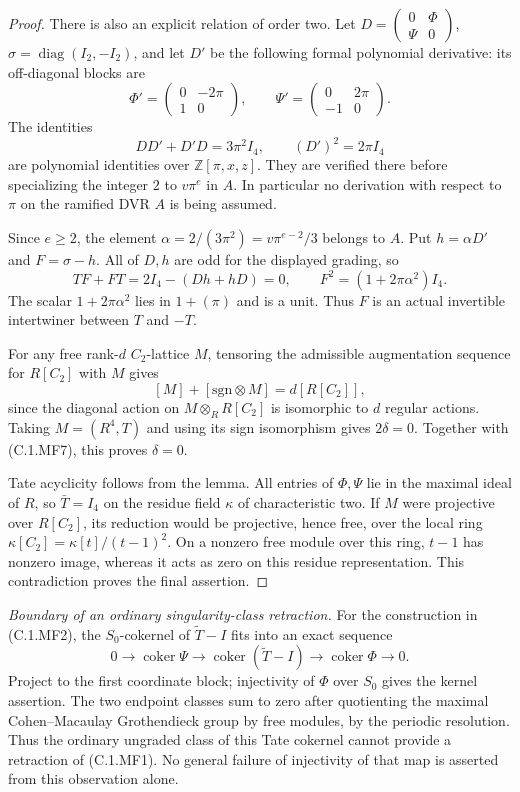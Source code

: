 \begin{proof}
There is also an explicit relation of order two.
Let $D=\left(\begin{smallmatrix}0&\Phi\\\Psi&0\end{smallmatrix}\right)$,
$\sigma=\operatorname{diag}(I_2,-I_2)$, and let $D'$
be the following formal polynomial derivative:
its off-diagonal blocks are
\[
 \Phi'=\begin{pmatrix}0&-2\pi\\1&0\end{pmatrix},
 \qquad
 \Psi'=\begin{pmatrix}0&2\pi\\-1&0\end{pmatrix}.
\]
The identities
\[
                  DD'+D'D=3\pi^2I_4,
                  \qquad (D')^2=2\pi I_4             \tag{C.1.MF8}
\]
are polynomial identities over $\mathbb Z[\pi,x,z]$.
They are verified there before specializing the integer
$2$ to $v\pi^e$ in $A$.
In particular no derivation with respect to $\pi$ on
the ramified DVR $A$ is being assumed.

Since $e\geq2$, the element
$\alpha=2/(3\pi^2)=v\pi^{e-2}/3$ belongs to $A$.
Put $h=\alpha D'$ and $F=\sigma-h$.
All of $D,h$ are odd for the displayed grading, so
\[
 TF+FT=2I_4-(Dh+hD)=0,
 \qquad
 F^2=(1+2\pi\alpha^2)I_4.                         \tag{C.1.MF9}
\]
The scalar $1+2\pi\alpha^2$ lies in $1+(\pi)$ and
is a unit.  Thus $F$ is an actual invertible
intertwiner between $T$ and $-T$.

For any free rank-$d$ $C_2$-lattice $M$, tensoring
the admissible augmentation sequence for $R[C_2]$
with $M$ gives
\[
 [M]+[\mathrm{sgn}\otimes M]=d[R[C_2]],
\]
since the diagonal action on $M\otimes_RR[C_2]$
is isomorphic to $d$ regular actions.
Taking $M=(R^4,T)$ and using its sign isomorphism
gives $2\delta=0$.
Together with (C.1.MF7), this proves $\delta=0$.

Tate acyclicity follows from the lemma.
All entries of $\Phi,\Psi$ lie in the maximal
ideal of $R$, so $\bar T=I_4$ on the residue field
$\kappa$ of characteristic two.
If $M$ were projective over $R[C_2]$, its reduction
would be projective, hence free, over the local ring
$\kappa[C_2]=\kappa[t]/(t-1)^2$.
On a nonzero free module over this ring, $t-1$ has
nonzero image, whereas it acts as zero on this
residue representation.  This contradiction proves
the final assertion.
\end{proof}

\noindent\emph{Boundary of an ordinary singularity-class retraction.}
For the construction in (C.1.MF2), the $S_0$-cokernel
of $\widetilde T-I$ fits into an exact sequence
\[
 0\longrightarrow\operatorname{coker}\Psi
  \longrightarrow\operatorname{coker}(\widetilde T-I)
  \longrightarrow\operatorname{coker}\Phi
  \longrightarrow0.
\]
Project to the first coordinate block; injectivity
of $\Phi$ over $S_0$ gives the kernel assertion.
The two endpoint classes sum to zero after quotienting
the maximal Cohen--Macaulay Grothendieck group by free
modules, by the periodic resolution.
Thus the ordinary ungraded class of this Tate cokernel
cannot provide a retraction of (C.1.MF1).
No general failure of injectivity of that map is
asserted from this observation alone.
